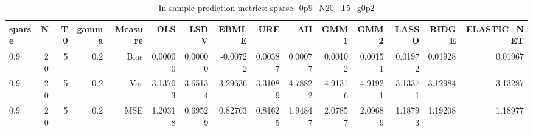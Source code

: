 \begin{table}[!htbp]\centering
\caption{In-sample prediction metrics: sparse_0p9_N20_T5_g0p2}
\label{tab:table2_sparse_0p9_N20_T5_g0p2}
\begin{tabular}{lrrrrrrrrrrrrrr}
\hline
sparse & N & T0 & gamma & Measure & OLS & LSDV & EBMLE & URE & AH & GMM1 & GMM2 & LASSO & RIDGE & ELASTIC_NET \\
\hline
0.9 & 20 & 5 & 0.2 & Bias & 0.00000 & 0.00000 & -0.00722 & 0.00387 & 0.00077 & 0.00102 & 0.00151 & 0.01972 & 0.01928 & 0.01967 \\
0.9 & 20 & 5 & 0.2 & Var & 3.13703 & 3.65134 & 3.29636 & 3.31089 & 4.78822 & 4.91316 & 4.91921 & 3.13371 & 3.12984 & 3.13287 \\
0.9 & 20 & 5 & 0.2 & MSE & 1.20318 & 0.69529 & 0.82763 & 0.81625 & 1.94847 & 2.07857 & 2.09689 & 1.18793 & 1.19208 & 1.18977 \\
\hline
\end{tabular}
\end{table}

